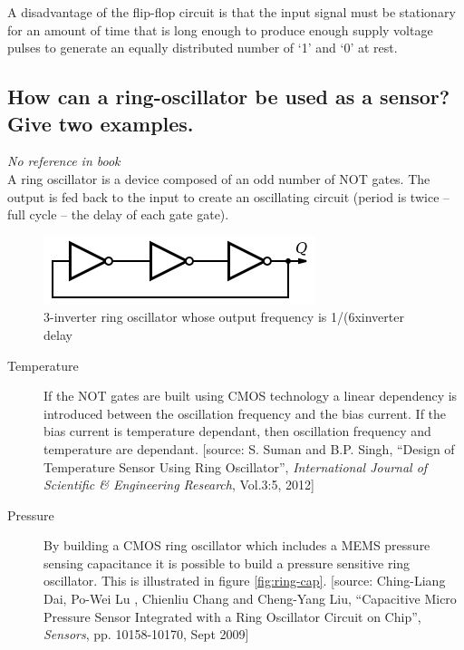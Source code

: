 \documentclass[10pt,a4paper]{article}
\begin{document}
A disadvantage of the flip-flop circuit is that the input signal must be stationary for an amount of time that is long enough to produce enough supply voltage pulses to generate an equally distributed number of `1' and `0' at rest. 

\subsection{How can a ring-oscillator be used as a sensor? Give two examples.}

\textit{No reference in book}\\

A ring oscillator is a device composed of an odd number of NOT gates. The output is fed back to the input to create an oscillating circuit (period is twice -- full cycle -- the delay of each gate gate).

\begin{figure}[h!]
    \centering
    \includegraphics{ring.png}
    \caption{3-inverter ring oscillator whose output frequency is 1/(6xinverter delay}
\end{figure}

\begin{description}
	\item[Temperature] If the NOT gates are built using CMOS technology a linear dependency is introduced between the oscillation frequency and the bias current. If the bias current is temperature dependant, then oscillation frequency and temperature are dependant. [source: S. Suman and B.P. Singh, ``Design of Temperature Sensor Using Ring Oscillator'', \textit{International Journal of Scientific \& Engineering Research}, Vol.3:5, 2012]
	\item[Pressure] By building a CMOS ring oscillator which includes a MEMS pressure sensing capacitance it is possible to build a pressure sensitive ring oscillator. This is illustrated in figure \ref{fig:ring-cap}. [source: Ching-Liang Dai, Po-Wei Lu , Chienliu Chang and Cheng-Yang Liu, ``Capacitive Micro Pressure Sensor Integrated with a Ring Oscillator Circuit on Chip'', \textit{Sensors}, pp. 10158-10170, Sept 2009]
\end{description}
\end{document}
